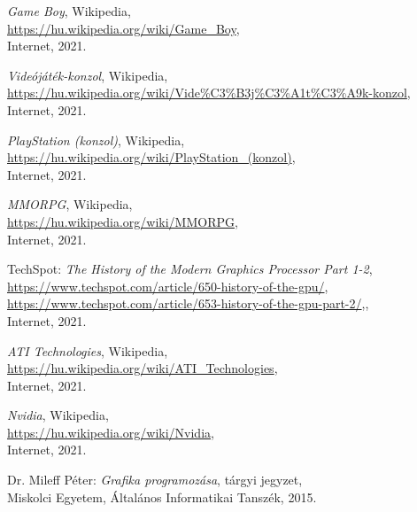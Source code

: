 \begin{thebibliography}{x}
	\emph{Game Boy}, Wikipedia, \\
	\url{https://hu.wikipedia.org/wiki/Game_Boy}, \\
	Internet, 2021.
	
	\emph{Videójáték-konzol}, Wikipedia, \\
	\url{https://hu.wikipedia.org/wiki/Vide\%C3\%B3j\%C3\%A1t\%C3\%A9k-konzol}, \\
	Internet, 2021.
	
	\emph{PlayStation (konzol)}, Wikipedia, \\
	\url{https://hu.wikipedia.org/wiki/PlayStation_(konzol)}, \\
	Internet, 2021.
	
	\emph{MMORPG}, Wikipedia, \\
	\url{https://hu.wikipedia.org/wiki/MMORPG}, \\
	Internet, 2021.
	
	TechSpot: \emph{The History of the Modern Graphics Processor Part 1-2}, \\
	\url{https://www.techspot.com/article/650-history-of-the-gpu/}, \\
	\url{https://www.techspot.com/article/653-history-of-the-gpu-part-2/},, \\
	Internet, 2021.
	
	\emph{ATI Technologies}, Wikipedia, \\
	\url{https://hu.wikipedia.org/wiki/ATI_Technologies}, \\
	Internet, 2021.
	
	\emph{Nvidia}, Wikipedia, \\
	\url{https://hu.wikipedia.org/wiki/Nvidia}, \\
	Internet, 2021.
	
	Dr. Mileff Péter: \emph{Grafika programozása}, tárgyi jegyzet, \\
	Miskolci Egyetem, Általános Informatikai Tanszék, 2015.
	

\end{thebibliography}
